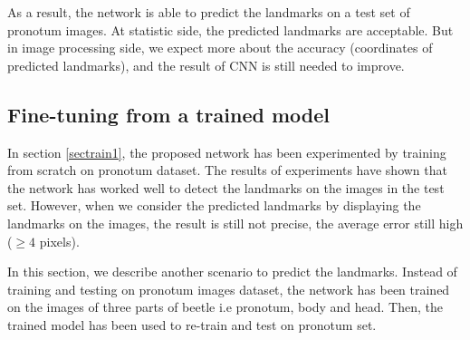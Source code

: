 \documentclass[10pt]{article}
\begin{document}


As a result, the network is able to predict the landmarks on a test set of pronotum images. At statistic side, the predicted landmarks are acceptable. But in image processing side, we expect more about the accuracy (coordinates of predicted landmarks), and the result of CNN is still needed to improve. 
\subsection{Fine-tuning from a trained model}
\label{secimproving}
In section \ref{sectrain1}, the proposed network has been experimented by training from scratch on pronotum dataset. The results of experiments have shown that the network has worked well to detect the landmarks on the images in the test set. However, when we consider the predicted landmarks by displaying the landmarks on the images, the result is still not precise, the average error still high ($\geq 4$ pixels). 

In this section, we describe another scenario to predict the landmarks. Instead of training and testing on pronotum images dataset, the network has been trained on the images of three parts of beetle i.e pronotum, body and head. Then, the trained model has been used to re-train and test on pronotum set.

\end{document}

